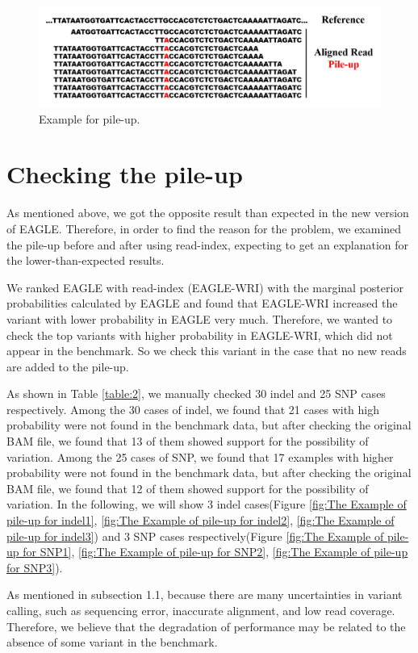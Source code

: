\documentclass[PhD]{PHlab-thesis}
\begin{document}
\begin{figure}[h!]
	\centering
	\includegraphics[scale=0.3]{figures/Pileup.png}
	\caption{Example for pile-up.}
	\label{fig:Example for pile-up}
\end{figure}

\section{Checking the pile-up}
As mentioned above, we got the opposite result than expected in the new version of EAGLE.  Therefore, in order to find the reason for the problem, we examined the pile-up before and after using read-index, expecting to get an explanation for the lower-than-expected results.

We ranked EAGLE with read-index (EAGLE-WRI) with the marginal posterior probabilities calculated by EAGLE and found that EAGLE-WRI increased the variant with lower probability in EAGLE very much. Therefore, we wanted to check the top variants with higher probability in EAGLE-WRI, which did not appear in the benchmark. So we check this variant in the case that no new reads are added to the pile-up.

As shown in Table \ref{table:2}, we manually checked 30 indel and 25 SNP cases respectively. Among the 30 cases of indel, we found that 21 cases with high probability were not found in the benchmark data, but after checking the original BAM file, we found that 13 of them showed support for the possibility of variation. Among the 25 cases of SNP, we found that 17 examples with higher probability were not found in the benchmark data, but after checking the original BAM file, we found that 12 of them showed support for the possibility of variation. In the following, we will show 3 indel cases(Figure \ref{fig:The Example of pile-up for indel1}, \ref{fig:The Example of pile-up for indel2}, \ref{fig:The Example of pile-up for indel3}) and 3 SNP cases respectively(Figure \ref{fig:The Example of pile-up for SNP1}, \ref{fig:The Example of pile-up for SNP2}, \ref{fig:The Example of pile-up for SNP3}).

As mentioned in subsection 1.1, because there are many uncertainties in variant calling, such as sequencing error, inaccurate alignment, and low read coverage. Therefore, we believe that the degradation of performance may be related to the absence of some variant in the benchmark.
\end{document}

